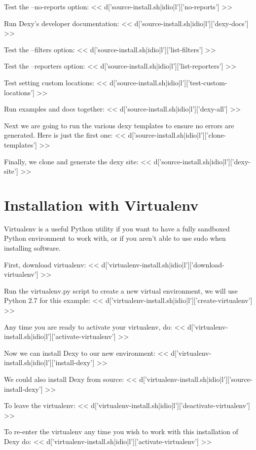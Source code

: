 \documentclass{tufte-handout}
\begin{document}
Test the --no-reports option:
<< d['source-install.sh|idio|l']['no-reports'] >>

Run Dexy's developer documentation:
<< d['source-install.sh|idio|l']['dexy-docs'] >>

Test the --filters option:
<< d['source-install.sh|idio|l']['list-filters'] >>

Test the --reporters option:
<< d['source-install.sh|idio|l']['list-reporters'] >>

Test setting custom locations:
<< d['source-install.sh|idio|l']['test-custom-locations'] >>

Run examples and docs together:
<< d['source-install.sh|idio|l']['dexy-all'] >>

Next we are going to run the various dexy templates to ensure no errors are generated. Here is just the first one:
<< d['source-install.sh|idio|l']['clone-templates'] >>

Finally, we clone and generate the dexy site:
<< d['source-install.sh|idio|l']['dexy-site'] >>

\section{Installation with Virtualenv}

Virtualenv is a useful Python utility if you want to have a fully sandboxed Python environment to work with, or if you aren't able to use sudo when installing software.

First, download virtualenv:
<< d['virtualenv-install.sh|idio|l']['download-virtualenv'] >>

Run the virtualenv.py script to create a new virtual environment, we will use Python 2.7 for this example:
<< d['virtualenv-install.sh|idio|l']['create-virtualenv'] >>

Any time you are ready to activate your virtualenv, do:
<< d['virtualenv-install.sh|idio|l']['activate-virtualenv'] >>

Now we can install Dexy to our new environment:
<< d['virtualenv-install.sh|idio|l']['install-dexy'] >>

We could also install Dexy from source:
<< d['virtualenv-install.sh|idio|l']['source-install-dexy'] >>

To leave the virtualenv:
<< d['virtualenv-install.sh|idio|l']['deactivate-virtualenv'] >>

To re-enter the virtualenv any time you wish to work with this installation of Dexy do:
<< d['virtualenv-install.sh|idio|l']['activate-virtualenv'] >>
\end{document}

